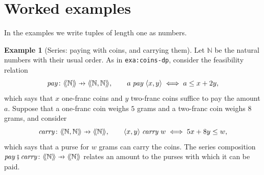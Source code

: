 \documentclass[11pt,a4paper]{article}
\theoremstyle{plain}
\theoremstyle{definition}
\newtheorem{example}[theorem]{Example}
\theoremstyle{remark}
\providecommand{\llangle}{\mathopen{\langle\mkern-3.5mu\langle}}
\providecommand{\rrangle}{\mathclose{\rangle\mkern-3.5mu\rangle}}
\newcommand{\tL}[1]{\llangle #1 \rrangle}
\newcommand{\then}{\mathbin{\fatsemi}}
\newcommand{\tup}[1]{\langle #1 \rangle}
\newcommand{\profto}{\mathrel{\ooalign{\hfil$\mapstochar\mkern 5mu$\hfil\cr$\to$\cr}}}
\newcommand{\rel}[3]{#1 \mathrel{#2} #3}
\newcommand{\N}{\mathbb{N}}
\newcommand{\lbl}[1]{\nolinkurl{#1}}
\begin{document}
\section{Worked examples}
\label{sec:examples}

In the examples we write tuples of length one as numbers.

\begin{example}[Series: paying with coins, and carrying them]
    \label{exa:coins}
    Let $\N$ be the natural numbers with their usual order.
    As in \lbl{exa:coins-dp}, consider the feasibility relation
    \begin{equation*}
        \mathit{pay} \colon \tL{\N} \profto \tL{\N, \N},
        \qquad
        \rel{a}{\mathit{pay}}{\tup{x,y}} \iff a \leq x + 2y,
    \end{equation*}
    which says that $x$ one-franc coins and $y$ two-franc coins suffice to pay the amount $a$.
    Suppose that a one-franc coin weighs $5$ grams and a two-franc coin weighs $8$ grams, and consider
    \begin{equation*}
        \mathit{carry} \colon \tL{\N, \N} \profto \tL{\N},
        \qquad
        \rel{\tup{x,y}}{\mathit{carry}}{w} \iff 5x + 8y \leq w,
    \end{equation*}
    which says that a purse for $w$ grams can carry the coins.
    The series composition $\mathit{pay} \then \mathit{carry} \colon \tL{\N} \profto \tL{\N}$ relates an amount to the purses with which it can be paid.


\end{example}
\end{document}
